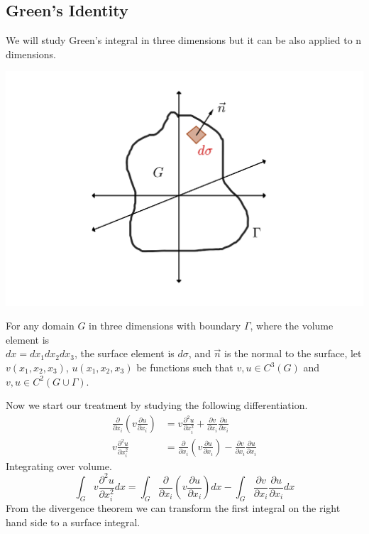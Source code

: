 \documentclass[]{article}
\begin{document}
\subsection{Green's Identity}
We will study Green's integral in three dimensions but it can be also applied to n dimensions.
\begin{center}
\includegraphics[scale=0.2]{green.png}
\end{center}
For any domain $G$ in three dimensions with boundary $\Gamma$, where the volume element is
\\
$dx = dx_1 dx_2 dx_3$, the surface element is $d\sigma$, and $\vec{n}$ is the normal to the surface, let $v(x_1,x_2,x_3)$, $u(x_1,x_2,x_3)$ be functions such that $v,u\in C^3(G)$ and $v,u\in C^2(G\cup \Gamma)$.
\par
Now we start our treatment by studying the following differentiation. 
\begin{align*}
\frac{\partial }{\partial x_i}\left(v\frac{\partial u}{\partial x_i}\right) &= v\frac{\partial^2 u}{\partial x_{i}^{2}} + \frac{\partial v}{\partial x_i}\frac{\partial u}{\partial x_i}
\\
v\frac{\partial^2 u}{\partial x_{i}^{2}} &= \frac{\partial }{\partial x_i}\left(v\frac{\partial u}{\partial x_i}\right) - \frac{\partial v}{\partial x_i}\frac{\partial u}{\partial x_i}
\end{align*}
Integrating over volume.
\[
    \int_G v\frac{\partial^2 u}{\partial x_{i}^{2}} dx = \int_G \frac{\partial }{\partial x_i}\left(v\frac{\partial u}{\partial x_i}\right) dx - \int_G \frac{\partial v}{\partial x_i}\frac{\partial u}{\partial x_i} dx    
\]
From the divergence theorem we can transform the first integral on the right hand side to a surface integral.
\end{document}
